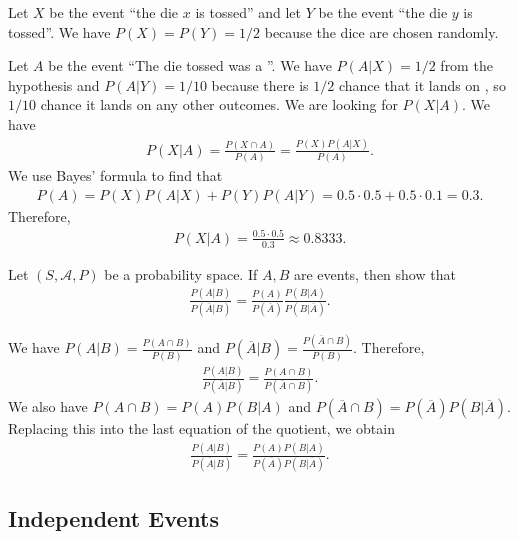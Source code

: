 	\begin{problem}
	Let $X$ be the event ``the die $x$ is tossed'' and let $Y$ be the event ``the die $y$ is tossed''. We have $P (X) = P (Y) = 1/2$ because the dice are chosen randomly.
	
	Let $A$ be the event ``The die tossed was a ''. We have $P (A | X) = 1/2$ from the hypothesis and $P (A | Y) = 1/10$ because there is $1/2$ chance that it lands on , so $1/10$ chance it lands on any other outcomes. We are looking for $P (X | A)$. We have
		\begin{align*}
		P (X | A) = \frac{P (X \cap A)}{P (A)} = \frac{P (X) P (A | X)}{P (A)} .
		\end{align*}
	We use Bayes' formula to find that
		\begin{align*}
		P (A) = P (X) P (A | X) + P (Y) P (A | Y) = 0.5 \cdot 0.5 + 0.5 \cdot 0.1 = 0.3 .
		\end{align*}
	Therefore, 
		\begin{align*}
		P (X | A) = \frac{0.5 \cdot 0.5}{0.3} \approx 0.8333 . \tag*{$\triangle$}
		\end{align*}
	\end{problem}

\begin{problem}
	Let $(S, \mathcal{A}, P )$ be a probability space. If $A, B$ are events, then show that
		\begin{align*}
		\frac{P (A|B)}{P (\overline{A} | B)} = \frac{P (A)}{P (\overline{A})} \frac{P (B|A)}{P (B|\overline{A})} .
		\end{align*}

	We have $P (A | B) = \frac{P (A \cap B)}{P (B)}$ and $P (\overline{A} | B) = \frac{P (\overline{A} \cap B)}{P (B)}$. Therefore,
		\begin{align*}
		\frac{P (A | B)}{P (\overline{A} | B)} = \frac{P (A \cap B)}{P (\overline{A} \cap B)} .
		\end{align*}
	We also have $P (A \cap B) = P (A) P (B |A)$ and $P (\overline{A} \cap B) = P (\overline{A}) P (B | \overline{A})$. Replacing this into the last equation of the quotient, we obtain
		\begin{align*}
		\frac{P (A |B)}{P (\overline{A} | B)} = \frac{P (A) P (B | A)}{P (\overline{A}) P (B | \overline{A})} . \tag*{$\triangle$}
		\end{align*}
	\end{problem}
	
	\subsection{Independent Events}
	

